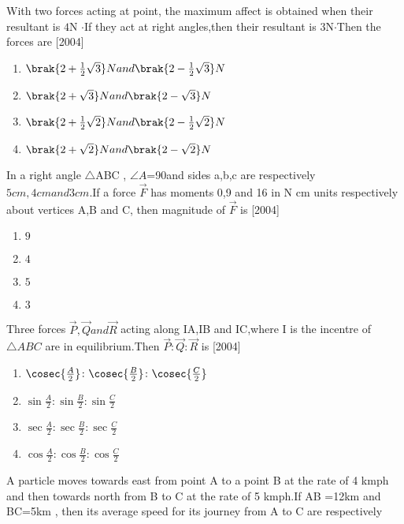 \iffalse
\title{22.MISCELLANEOUS}
\author{AI24BTECH11006 - Bugada Roopansha}
\section{mains}
\fi
\item With two forces acting at point, the maximum affect is obtained when their resultant is $4$N $\cdot$If they act at right angles,then their resultant is $3$N$\cdot$Then the forces are
\hfill{[2004]}
\begin{enumerate}
\item $\brak{2+\frac{1}{2}\sqrt{3}}N and\brak{2-\frac{1}{2}\sqrt{3}}N$
\item $\brak{2+\sqrt{3}}N and \brak{2-\sqrt{3}}N$
\item  $\brak{2+\frac{1}{2}\sqrt{2}}N and\brak{2-\frac{1}{2}\sqrt{2}}N$
\item $\brak{2+\sqrt{2}}N and \brak{2-\sqrt{2}}N$
\end{enumerate}
\item In a right angle $\triangle$ABC , $\angle A$=90\degree and sides a,b,c are respectively $5cm,4cm and 3cm .$If a force $ \vec{F}$ has moments 0,9 and 16 in N cm units respectively about vertices A,B and C, then magnitude of $\vec{F}$ is
\hfill{[2004]}
\begin{enumerate}
\item $9$
\item $4$
\item $5$
\item $3$
\end{enumerate}
\item Three forces $\vec{P},\vec{Q} and\vec{R}$ acting along IA,IB and IC,where I is the incentre of $\triangle{ABC}$ are in equilibrium.Then $\vec{P} \colon \vec{Q} \colon \vec{R}$ is
\hfill{[2004]}
\begin{enumerate}
\item $\cosec{\frac{A}{2}}\colon\cosec{\frac{B}{2}}\colon\cosec{\frac{C}{2}}$
\item $\sin{\frac{A}{2}}\colon\sin{\frac{B}{2}}\colon\sin{\frac{C}{2}}$
\item $\sec{\frac{A}{2}}\colon\sec{\frac{B}{2}}\colon\sec{\frac{C}{2}}$
\item $\cos{\frac{A}{2}}\colon \cos{\frac{B}{2}}\colon \cos{\frac{C}{2}}$
\end{enumerate}
\item A particle moves towards east from point A to a point B at the rate of 4 kmph and then towards north from B to C at the rate of 5 kmph.If AB =12km and BC=5km , then its average speed for its journey from A to C are respectively
